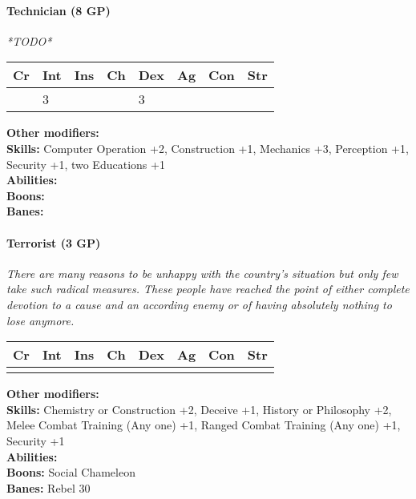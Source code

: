 \paragraph*{Technician (8 GP)}
\textit{*TODO*}\par
\begin{tabular}{|l|l|l|l|l|l|l|l|}
    \hline
    Cr & Int & Ins & Ch & Dex & Ag & Con & Str \\ \hline
    & 3 &  &  & 3 &  &  &  \\ \hline
\end{tabular}\par
\noindent\textbf{Other modifiers:} \\
\textbf{Skills:} Computer Operation +2,
Construction +1,
Mechanics +3,
Perception +1,
Security +1,
two Educations +1\\
\textbf{Abilities:} \\
\textbf{Boons:} \\
\textbf{Banes:} \\

\hrulefill
\paragraph*{Terrorist (3 GP)}
\textit{There are many reasons to be unhappy with the country's situation but only few take such radical measures. These people have reached the point of either complete devotion to a cause and an according enemy or of having absolutely nothing to lose anymore.}\par
\begin{tabular}{|l|l|l|l|l|l|l|l|}
	\hline
	Cr & Int & Ins & Ch & Dex & Ag & Con & Str \\ \hline
	&  &  &  &  &  &  &  \\ \hline
\end{tabular}\par
\noindent\textbf{Other modifiers:} \\
\textbf{Skills:} Chemistry or Construction +2,
Deceive +1,
History or Philosophy +2,
Melee Combat Training (Any one) +1,
Ranged Combat Training (Any one) +1,
Security +1\\
\textbf{Abilities:} \\
\textbf{Boons:} Social Chameleon\\
\textbf{Banes:} Rebel 30\\

\hrulefill
